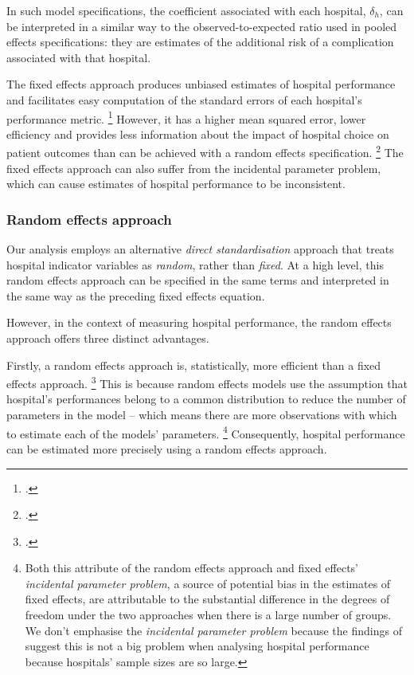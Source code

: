 \documentclass[submission]{grattan}
\begin{document}
In such model specifications, the coefficient associated with each hospital, \(\delta_{h}\), can be interpreted in a similar way to the observed-to-expected ratio used in pooled effects specifications: they are estimates of the additional risk of a complication associated with that hospital.

The fixed effects approach produces unbiased estimates of hospital performance and facilitates easy computation of the standard errors of each hospital's performance metric.%
	\footcite{Cameron-Trivedi-Microeconometrics-methods}
However, it has a higher mean squared error, lower efficiency and provides less information about the impact of hospital choice on patient outcomes than can be achieved with a random effects specification.%
	\footcites{Ash-etal-2012-Stats-issues-assessing-hospital-perf}{bell_jones_2015-explaining-fixed-effects}
The fixed effects approach can also suffer from the incidental parameter problem, which can cause estimates of hospital performance to be inconsistent.

\subsubsection{Random effects approach}\label{subsubsec:random-effects-approach}

Our analysis employs an alternative \emph{direct standardisation} approach that treats hospital indicator variables as \emph{random}, rather than \emph{fixed}.
At a high level, this random effects approach can be specified in the same terms and interpreted in the same way as the preceding fixed effects equation.

However, in the context of measuring hospital performance, the random effects approach offers three distinct advantages.

Firstly, a random effects approach is, statistically, more efficient than a fixed effects approach.%
	\footcite{Ash-etal-2012-Stats-issues-assessing-hospital-perf}
This is because random effects models use the assumption that hospital's performances belong to a common distribution to reduce the number of parameters in the model -- which means there are more observations with which to estimate each of the models' parameters.%
	\footnote{Both this attribute of the random effects approach and fixed effects' \emph{incidental parameter problem}, a source of potential bias in the estimates of fixed effects, are attributable to the substantial difference in the degrees of freedom under the two approaches when there is a large number of groups.
	We don't emphasise the \emph{incidental parameter problem} because the findings of \textcite{Moran_2014} suggest this is not a big problem when analysing hospital performance because hospitals' sample sizes are so large.}
Consequently, hospital performance can be estimated more precisely using a random effects approach.
\end{document}
